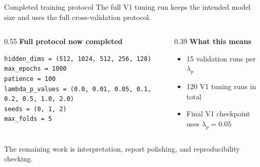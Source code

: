 \documentclass[aspectratio=169,10pt]{beamer}
\newcommand{\smallgray}[1]{\textcolor{projectGray}{#1}}
\begin{document}
\begin{frame}[fragile]{Completed training protocol}
  \smallgray{The full V1 tuning run keeps the intended model size and uses the full cross-validation protocol.}

  \vspace{0.25cm}
  \begin{columns}[T,totalwidth=\linewidth]
    \begin{column}{0.55\linewidth}
      \textbf{\textcolor{projectBlue}{Full protocol now completed}}
      \vspace{0.1cm}
      {\fontsize{6}{7}\selectfont
        \begin{verbatim}
hidden_dims = (512, 1024, 512, 256, 128)
max_epochs = 1000
patience = 100
lambda_p_values = (0.0, 0.01, 0.05, 0.1, 0.2, 0.5, 1.0, 2.0)
seeds = (0, 1, 2)
max_folds = 5
      \end{verbatim}}
    \end{column}
    \begin{column}{0.39\linewidth}
      \textbf{\textcolor{projectBlue}{What this means}}
      \vspace{0.15cm}
      {\small
        \begin{itemize}
          \item 15 validation runs per \(\lambda_p\)
          \item 120 V1 tuning runs in total
          \item Final V1 checkpoint uses \(\lambda_p=0.05\)
        \end{itemize}}
    \end{column}
  \end{columns}

  \vspace{0.25cm}
  \smallgray{The remaining work is interpretation, report polishing, and reproducibility checking.}
\end{frame}
\end{document}
